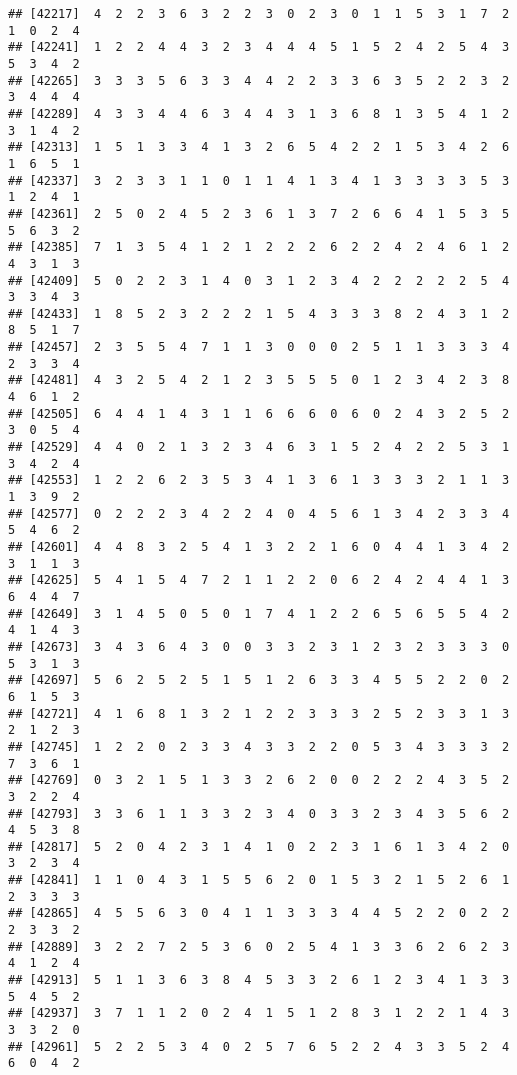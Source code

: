 \documentclass[
]{article}
\begin{document}
\begin{verbatim}
## [42217]  4  2  2  3  6  3  2  2  3  0  2  3  0  1  1  5  3  1  7  2  1  0  2  4
## [42241]  1  2  2  4  4  3  2  3  4  4  4  5  1  5  2  4  2  5  4  3  5  3  4  2
## [42265]  3  3  3  5  6  3  3  4  4  2  2  3  3  6  3  5  2  2  3  2  3  4  4  4
## [42289]  4  3  3  4  4  6  3  4  4  3  1  3  6  8  1  3  5  4  1  2  3  1  4  2
## [42313]  1  5  1  3  3  4  1  3  2  6  5  4  2  2  1  5  3  4  2  6  1  6  5  1
## [42337]  3  2  3  3  1  1  0  1  1  4  1  3  4  1  3  3  3  3  5  3  1  2  4  1
## [42361]  2  5  0  2  4  5  2  3  6  1  3  7  2  6  6  4  1  5  3  5  5  6  3  2
## [42385]  7  1  3  5  4  1  2  1  2  2  2  6  2  2  4  2  4  6  1  2  4  3  1  3
## [42409]  5  0  2  2  3  1  4  0  3  1  2  3  4  2  2  2  2  2  5  4  3  3  4  3
## [42433]  1  8  5  2  3  2  2  2  1  5  4  3  3  3  8  2  4  3  1  2  8  5  1  7
## [42457]  2  3  5  5  4  7  1  1  3  0  0  0  2  5  1  1  3  3  3  4  2  3  3  4
## [42481]  4  3  2  5  4  2  1  2  3  5  5  5  0  1  2  3  4  2  3  8  4  6  1  2
## [42505]  6  4  4  1  4  3  1  1  6  6  6  0  6  0  2  4  3  2  5  2  3  0  5  4
## [42529]  4  4  0  2  1  3  2  3  4  6  3  1  5  2  4  2  2  5  3  1  3  4  2  4
## [42553]  1  2  2  6  2  3  5  3  4  1  3  6  1  3  3  3  2  1  1  3  1  3  9  2
## [42577]  0  2  2  2  3  4  2  2  4  0  4  5  6  1  3  4  2  3  3  4  5  4  6  2
## [42601]  4  4  8  3  2  5  4  1  3  2  2  1  6  0  4  4  1  3  4  2  3  1  1  3
## [42625]  5  4  1  5  4  7  2  1  1  2  2  0  6  2  4  2  4  4  1  3  6  4  4  7
## [42649]  3  1  4  5  0  5  0  1  7  4  1  2  2  6  5  6  5  5  4  2  4  1  4  3
## [42673]  3  4  3  6  4  3  0  0  3  3  2  3  1  2  3  2  3  3  3  0  5  3  1  3
## [42697]  5  6  2  5  2  5  1  5  1  2  6  3  3  4  5  5  2  2  0  2  6  1  5  3
## [42721]  4  1  6  8  1  3  2  1  2  2  3  3  3  2  5  2  3  3  1  3  2  1  2  3
## [42745]  1  2  2  0  2  3  3  4  3  3  2  2  0  5  3  4  3  3  3  2  7  3  6  1
## [42769]  0  3  2  1  5  1  3  3  2  6  2  0  0  2  2  2  4  3  5  2  3  2  2  4
## [42793]  3  3  6  1  1  3  3  2  3  4  0  3  3  2  3  4  3  5  6  2  4  5  3  8
## [42817]  5  2  0  4  2  3  1  4  1  0  2  2  3  1  6  1  3  4  2  0  3  2  3  4
## [42841]  1  1  0  4  3  1  5  5  6  2  0  1  5  3  2  1  5  2  6  1  2  3  3  3
## [42865]  4  5  5  6  3  0  4  1  1  3  3  3  4  4  5  2  2  0  2  2  2  3  3  2
## [42889]  3  2  2  7  2  5  3  6  0  2  5  4  1  3  3  6  2  6  2  3  4  1  2  4
## [42913]  5  1  1  3  6  3  8  4  5  3  3  2  6  1  2  3  4  1  3  3  5  4  5  2
## [42937]  3  7  1  1  2  0  2  4  1  5  1  2  8  3  1  2  2  1  4  3  3  3  2  0
## [42961]  5  2  2  5  3  4  0  2  5  7  6  5  2  2  4  3  3  5  2  4  6  0  4  2

\end{verbatim}
\end{document}
